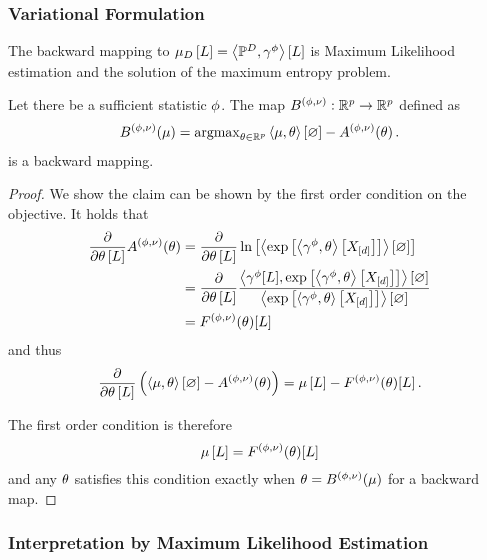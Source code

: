 \subsubsection{Variational Formulation}

The backward mapping to $\mu_{D}\left[L\right] = \left\langle \mathbb{P}^{D},\gamma^{\phi}\right\rangle \left[ L \right]$ is Maximum Likelihood estimation and the solution of the maximum entropy problem.

\begin{theorem}\label{the:varBackward}
	Let there be a sufficient statistic $\phi$.
	The map $B^{(\phi,\nu)}: \mathbb{R}^{p}\rightarrow \mathbb{R}^{p}$ defined as
	\begin{align*}
		B^{(\phi,\nu)}(\mu)
		= \mathrm{argmax}_{\theta\in\mathbb{R}^{p}}  \left\langle \mu,\theta\right\rangle \left[ \varnothing \right] - A^{(\phi,\nu)}(\theta) \, . 
	\end{align*}
	is a backward mapping.
\end{theorem}
\begin{proof}
	We show the claim can be shown by the first order condition on the objective.	
	It holds that
	\begin{align*}
		\frac{\partial }{\partial \theta\left[L\right]}  A^{(\phi,\nu)}(\theta)  
		 & = \frac{\partial }{\partial \theta\left[L\right]}  \ln \left[ \left\langle \mathrm{exp}\left[\left\langle \gamma^{\phi},\theta\right\rangle \left[ X_{[d]} \right]\right]\right\rangle \left[ \varnothing \right] \right] \\
		 & = \frac{\partial }{\partial \theta\left[L\right]} \frac{\left\langle \gamma^{\phi}[L],\mathrm{exp}\left[\left\langle \gamma^{\phi},\theta\right\rangle \left[ X_{[d]} \right]\right]\right\rangle \left[ \varnothing \right]}{\left\langle \mathrm{exp}\left[\left\langle \gamma^{\phi},\theta\right\rangle \left[ X_{[d]} \right]\right]\right\rangle \left[ \varnothing \right]}   \\
		 & = F^{(\phi,\nu)}(\theta)[L]
	\end{align*}
	and thus
	\begin{align*}
		\frac{\partial }{\partial \theta\left[L\right]} \left( \left\langle \mu,\theta\right\rangle \left[ \varnothing \right] - A^{(\phi,\nu)}(\theta)  \right) 
		= \mu\left[L\right] -  F^{(\phi,\nu)}(\theta)[L] \, . 
	\end{align*}
	
	The first order condition is therefore 
		\[ \mu\left[L\right] =  F^{(\phi,\nu)}(\theta)[L] \]
	and any $\theta$ satisfies this condition exactly when $\theta=B^{(\phi,\nu)}(\mu)$ for a backward map.
\end{proof}


\subsubsection{Interpretation by Maximum Likelihood Estimation}

